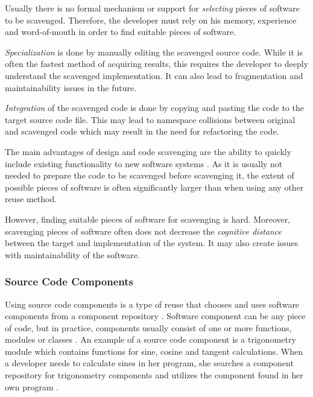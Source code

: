 Usually there is no formal mechanism or support for \emph{selecting} pieces of software to be scavenged. Therefore, the developer must rely on his memory, experience and word-of-mouth in order to find suitable pieces of software. \citep[chap.~3]{sametinger_software_1997}

\emph{Specialization} is done by manually editing the scavenged source code. While it is often the fastest method of acquiring results, this requires the developer to deeply understand the scavenged implementation. It can also lead to fragmentation and maintainability issues in the future. \citep[chap.~4]{krueger_software_1992}

\emph{Integration} of the scavenged code is done by copying and pasting the code to the target source code file. This may lead to namespace collisions between original and scavenged code which may result in the need for refactoring the code. \citep[chap.~4]{krueger_software_1992}

The main advantages of design and code scavenging are the ability to quickly include existing functionality to new software systems \citep[chap.~4]{krueger_software_1992}. As it is usually not needed to prepare the code to be scavenged before scavenging it, the extent of possible pieces of software is often significantly larger than when using any other reuse method. 

However, finding suitable pieces of software for scavenging is hard. Moreover, scavenging pieces of software often does not decrease the \emph{cognitive distance} between the target and implementation of the system. It may also create issues with maintainability of the software. \citep[chap.~4]{krueger_software_1992}

\subsubsection{Source Code Components}

Using source code components is a type of reuse that chooses and uses software components from a component repository \citep[chap.~3]{sametinger_software_1997}. Software component can be any piece of code, but in practice, components usually consist of one or more functions, modules or classes \citep[chap.~3]{sametinger_software_1997}. An example of a source code component is a trigonometry module which contains functions for sine, cosine and tangent calculations. When a developer needs to calculate sines in her program, she searches a component repository for trigonometry components and utilizes the component found in her own program \citep[chap.~5]{krueger_software_1992}.

